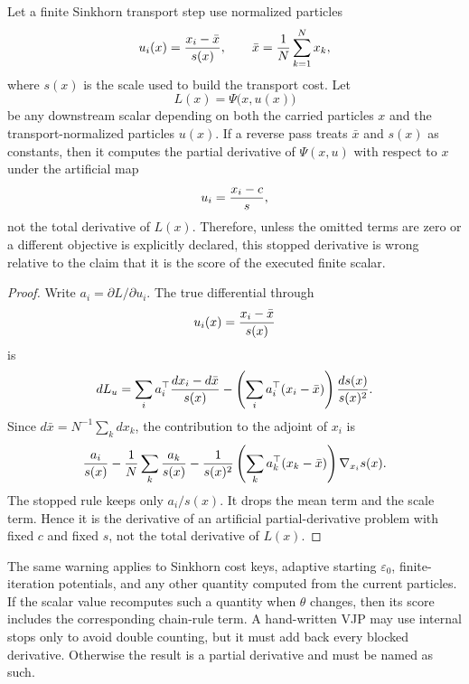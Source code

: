 \begin{proposition}
\label{prop:bf-eot-stopped-normalization-partial}
Let a finite Sinkhorn transport step use normalized particles
\[
  u_i(x)={x_i-\bar x\over s(x)},\qquad
  \bar x={1\over N}\sum_{k=1}^N x_k,
\]
where \(s(x)\) is the scale used to build the transport cost.  Let
\[
  L(x)=\Psi\bigl(x,u(x)\bigr)
\]
be any downstream scalar depending on both the carried particles \(x\) and the
transport-normalized particles \(u(x)\).  If a reverse pass treats \(\bar x\)
and \(s(x)\) as constants, then it computes the partial derivative of
\(\Psi(x,u)\) with respect to \(x\) under the artificial map
\[
  u_i={x_i-c\over s},
\]
not the total derivative of \(L(x)\).  Therefore, unless the omitted terms are
zero or a different objective is explicitly declared, this stopped derivative is
wrong relative to the claim that it is the score of the executed finite scalar.
\end{proposition}

\begin{proof}
Write \(a_i=\partial L/\partial u_i\).  The true differential through
\[
  u_i(x)={x_i-\bar x\over s(x)}
\]
is
\[
  dL_u
  =
  \sum_i a_i^\top {dx_i-d\bar x\over s(x)}
  -
  \left(\sum_i a_i^\top (x_i-\bar x)\right){ds(x)\over s(x)^2}.
\]
Since \(d\bar x=N^{-1}\sum_k dx_k\), the contribution to the adjoint of
\(x_i\) is
\[
  {a_i\over s(x)}
  -
  {1\over N}\sum_k {a_k\over s(x)}
  -
  {1\over s(x)^2}
  \left(\sum_k a_k^\top (x_k-\bar x)\right)\nabla_{x_i}s(x).
\]
The stopped rule keeps only \(a_i/s(x)\).  It drops the mean term and the scale
term.  Hence it is the derivative of an artificial partial-derivative problem
with fixed \(c\) and fixed \(s\), not the total derivative of \(L(x)\).
\end{proof}

The same warning applies to Sinkhorn cost keys, adaptive starting
\(\varepsilon_0\), finite-iteration potentials, and any other quantity computed
from the current particles.  If the scalar value recomputes such a quantity
when \(\theta\) changes, then its score includes the corresponding chain-rule
term.  A hand-written VJP may use internal stops only to avoid double counting,
but it must add back every blocked derivative.  Otherwise the result is a
partial derivative and must be named as such.

